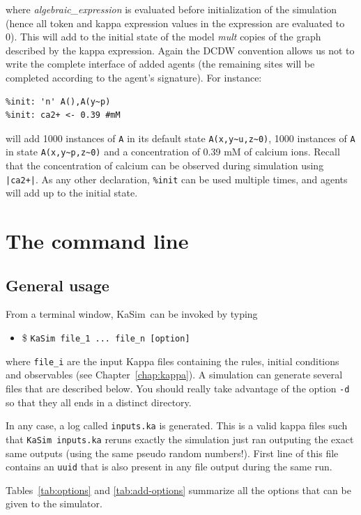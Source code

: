 \documentclass[11pt]{book}
\def\KaSim{\textsf{KaSim}}
\def\intstate{\textasciitilde}
\def\ttt#1{\texttt{#1}}
\def\ITE#1{\begin{itemize}#1\end{itemize}}
\begin{document}
where \textit{algebraic\_expression} is evaluated before initialization of the simulation (hence all token and kappa expression values in the expression are evaluated to 0). This will add to the initial state of the model \textit{mult} copies of the graph described by the kappa expression. Again the DCDW convention allows us not to write the complete interface of added agents (the remaining sites will be completed according to the agent's signature). For instance:
\begin{lstlisting}[language=kappa]
%var: 'n' 1000
%init: 'n' A(),A(y~p)
%init: ca2+ <- 0.39 #mM
\end{lstlisting}
will add 1000 instances of \ttt{A} in its default state \ttt{A(x,y\intstate u,z\intstate 0)}, 1000 instances of \ttt{A} in state \ttt{A(x,y\intstate p,z\intstate 0)} and a concentration of 0.39 mM of calcium ions. Recall that the concentration of calcium can be observed during simulation using \ttt{|ca2+|}.
As any other declaration, \ttt{\%init} can be used multiple times, and agents will add up to the initial state.


\chapter{The command line}\label{chap:cl}

\section{General usage}
From a terminal window, \KaSim~can be invoked by typing
\ITE{
\item[\$] \ttt{KaSim file\_1 ... file\_n [option] } } where
\ttt{file\_i} are the input Kappa files containing the rules, initial
conditions and observables (see Chapter~\ref{chap:kappa}). A
simulation can generate several files that are described below. You
should really take advantage of the option \ttt{-d} so that they all
ends in a distinct directory.

In any case, a log called \ttt{inputs.ka} is generated. This is a
valid kappa files such that \ttt{KaSim inputs.ka} reruns exactly the
simulation just ran outputing the exact same outputs (using the same
pseudo random numbers!). First line of this file contains an \ttt{uuid}
that is also present in any file output during the same run.

Tables~\ref{tab:options} and \ref{tab:add-options} summarize all the
options that can be given to the simulator.
\end{document}
